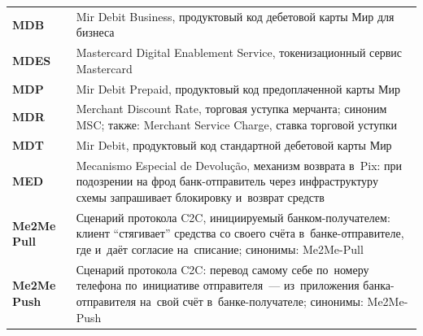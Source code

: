 \begin{longtable}{@{}p{4.5em}p{\dimexpr\linewidth-4.5em-2\tabcolsep\relax}@{}}
  \textbf{MDB}               & Mir Debit Business, продуктовый код дебетовой карты Мир для бизнеса                                                                                                                                                                                                                              \\
  \textbf{MDES}              & Mastercard Digital Enablement Service, токенизационный сервис Mastercard                                                                                                                                                                                                                         \\
  \textbf{MDP}               & Mir Debit Prepaid, продуктовый код предоплаченной карты Мир                                                                                                                                                                                                                                      \\
  \textbf{MDR}               & Merchant Discount Rate, торговая уступка мерчанта; синоним MSC; также: Merchant Service Charge, ставка торговой уступки                                                                                                                                                                          \\
  \textbf{MDT}               & Mir Debit, продуктовый код стандартной дебетовой карты Мир                                                                                                                                                                                                                                       \\
  \textbf{MED}               & Mecanismo Especial de Devolução, механизм возврата в~Pix: при подозрении на фрод банк-отправитель через инфраструктуру схемы запрашивает блокировку и~возврат средств                                                                                                                          \\
  \textbf{Me2Me Pull}        & Сценарий протокола C2C, инициируемый банком-получателем: клиент \enquote{стягивает} средства со своего счёта в~банке-отправителе, где и~даёт согласие на~списание; синонимы: Me2Me-Pull                                                                                             \\
  \textbf{Me2Me Push}        & Сценарий протокола C2C: перевод самому себе по~номеру телефона по~инициативе отправителя~--- из~приложения банка-отправителя на~свой счёт в~банке-получателе; синонимы: Me2Me-Push                                                                                                                       \\

\end{longtable}
